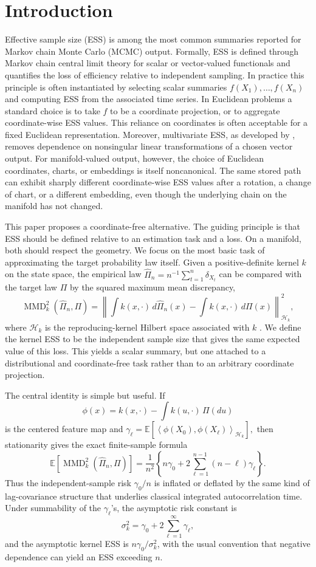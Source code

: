 \documentclass[11pt]{article}
\newcommand{\E}{\mathbb{E}}
\newcommand{\1}{\mathbf{1}}
\newcommand{\inner}[2]{\left\langle #1, #2 \right\rangle}
\newcommand{\MMD}{\operatorname{MMD}}
\newcommand{\Hk}{\mathcal{H}_k}
\begin{document}
\section{Introduction}
Effective sample size (ESS) is among the most common summaries reported for Markov chain Monte Carlo (MCMC) output. Formally, ESS is defined through Markov chain central limit theory for scalar or vector-valued functionals and quantifies the loss of efficiency relative to independent sampling. In practice this principle is often instantiated by selecting scalar summaries $f(X_1),\ldots,f(X_n)$ and computing ESS from the associated time series. In Euclidean problems a standard choice is to take $f$ to be a coordinate projection, or to aggregate coordinate-wise ESS values. This reliance on coordinates is often acceptable for a fixed Euclidean representation. Moreover, multivariate ESS, as developed by \citet{vats_2019_MultivariateOutputAnalysis}, removes dependence on nonsingular linear transformations of a chosen vector output. For manifold-valued output, however, the choice of Euclidean coordinates, charts, or embeddings is itself noncanonical. The same stored path can exhibit sharply different coordinate-wise ESS values after a rotation, a change of chart, or a different embedding, even though the underlying chain on the manifold has not changed.



This paper proposes a coordinate-free alternative. The guiding principle is that ESS should be defined relative to an estimation task and a loss. On a manifold, both should respect the geometry. We focus on the most basic task of approximating the target probability law itself. Given a positive-definite kernel $k$ on the state space, the empirical law $\hat\Pi_n=n^{-1}\sum_{t=1}^n\delta_{X_t}$ can be compared with the target law $\Pi$ by the squared maximum mean discrepancy,
\[
\MMD_k^2(\hat\Pi_n,\Pi)
=\left\|\int k(x,\cdot)\,d\hat\Pi_n(x)-\int k(x,\cdot)\,d\Pi(x)\right\|_{\Hk}^2,
\]
where $\Hk$ is the reproducing-kernel Hilbert space associated with $k$  \citep{gretton_2012_KernelTwoSampleTest}. We define the kernel ESS to be the independent sample size that gives the same expected value of this loss. This yields a scalar summary, but one attached to a distributional and coordinate-free task rather than to an arbitrary coordinate projection.

The central identity is simple but useful. If
\[
\phi(x)=k(x,\cdot)-\int k(u,\cdot)\,\Pi(du)
\]
is the centered feature map and
$
\gamma_\ell=\E[\inner{\phi(X_0)}{\phi(X_\ell)}_{\Hk}],
$
then stationarity gives the exact finite-sample formula
\[
\E[\MMD_k^2(\hat\Pi_n,\Pi)]
=
\frac{1}{n^2}\left\{n\gamma_0+2\sum_{\ell=1}^{n-1}(n-\ell)\gamma_\ell\right\}.
\]
Thus the independent-sample risk $\gamma_0/n$ is inflated or deflated by the same kind of lag-covariance structure that underlies classical integrated autocorrelation time. Under summability of the $\gamma_\ell$'s, the asymptotic risk constant is
\[
\sigma_k^2=\gamma_0+2\sum_{\ell=1}^\infty\gamma_\ell,
\]
and the asymptotic kernel ESS is $n\gamma_0/\sigma_k^2$, with the usual convention that negative dependence can yield an ESS exceeding $n$.
\end{document}
